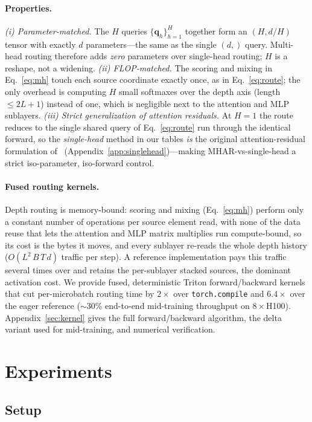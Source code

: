 \documentclass{article}
\begin{document}
\paragraph{Properties.}
\emph{(i) Parameter-matched.} The $H$ queries
$\{\mathbf{q}_h\}_{h=1}^{H}$ together form an $(H, d/H)$ tensor with exactly $d$
parameters---the same as the single $(d,)$ query. Multi-head routing therefore
adds \emph{zero} parameters over single-head routing; $H$ is a reshape, not a
widening.
\emph{(ii) FLOP-matched.} The scoring and mixing in Eq.~\ref{eq:mh} touch each
source coordinate exactly once, as in Eq.~\ref{eq:route}; the only overhead is
computing $H$ small softmaxes over the depth axis (length $\le 2L{+}1$) instead
of one, which is negligible next to the attention and MLP sublayers.
\emph{(iii) Strict generalization of attention residuals.} At $H{=}1$ the route
reduces to the single shared query of Eq.~\ref{eq:route} run through the identical
forward, so the \emph{single-head} method in our tables \emph{is} the original
attention-residual formulation of~\citet{kimi2025attention}
(Appendix~\ref{app:singlehead})---making MHAR-vs-single-head a strict
iso-parameter, iso-forward control.

\paragraph{Fused routing kernels.} Depth routing is memory-bound: scoring and mixing (Eq.~\ref{eq:mh}) perform only a constant number of operations per source element read, with none of the data reuse that lets the attention and MLP matrix multiplies run compute-bound, so its cost is the bytes it moves, and every sublayer re-reads the whole depth history ($O(L^2\,B\,T\,d)$ traffic per step). A reference implementation pays this traffic several times over and retains the per-sublayer stacked sources, the dominant activation cost. We provide fused, deterministic Triton forward/backward kernels that cut per-microbatch routing time by $2\times$ over \texttt{torch.compile} and $6.4\times$ over the eager reference (${\sim}30\%$ end-to-end mid-training throughput on $8\times$H100). Appendix~\ref{sec:kernel} gives the full forward/backward algorithm, the delta variant used for mid-training, and numerical verification.

\section{Experiments}
\label{sec:exp}

\subsection{Setup}
\end{document}

